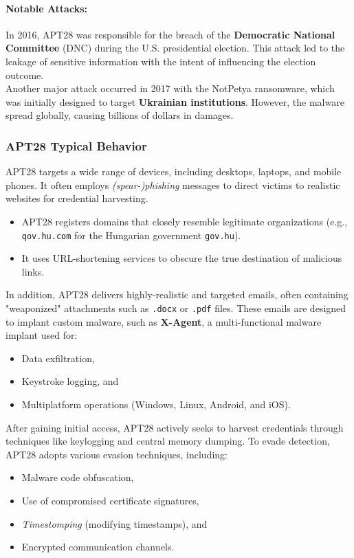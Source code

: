 \paragraph{Notable Attacks:} In 2016, APT28 was responsible for the breach of the \textbf{Democratic National Committee} (DNC) during the U.S. presidential election. This attack led to the leakage of sensitive information with the intent of influencing the election outcome. \\Another major attack occurred in 2017 with the NotPetya ransomware, which was initially designed to target \textbf{Ukrainian institutions}. However, the malware spread globally, causing billions of dollars in damages.


\subsubsection{APT28 Typical Behavior}

APT28 targets a wide range of devices, including desktops, laptops, and mobile phones. It often employs \textit{(spear-)phishing} messages to direct victims to realistic websites for credential harvesting. 

\begin{itemize}
    \item APT28 registers domains that closely resemble legitimate organizations (e.g., \texttt{qov.hu.com} for the Hungarian government \texttt{gov.hu}).
    \item It uses URL-shortening services to obscure the true destination of malicious links.
\end{itemize}

In addition, APT28 delivers highly-realistic and targeted emails, often containing "weaponized" attachments such as \texttt{.docx} or \texttt{.pdf} files. These emails are designed to implant custom malware, such as \textbf{X-Agent}, a multi-functional malware implant used for:
\begin{itemize}
    \item Data exfiltration,
    \item Keystroke logging, and
    \item Multiplatform operations (Windows, Linux, Android, and iOS).
\end{itemize}

After gaining initial access, APT28 actively seeks to harvest credentials through techniques like keylogging and central memory dumping. To evade detection, APT28 adopts various evasion techniques, including:
\begin{itemize}
    \item Malware code obfuscation,
    \item Use of compromised certificate signatures,
    \item \textit{Timestomping} (modifying timestamps), and
    \item Encrypted communication channels.
\end{itemize}

